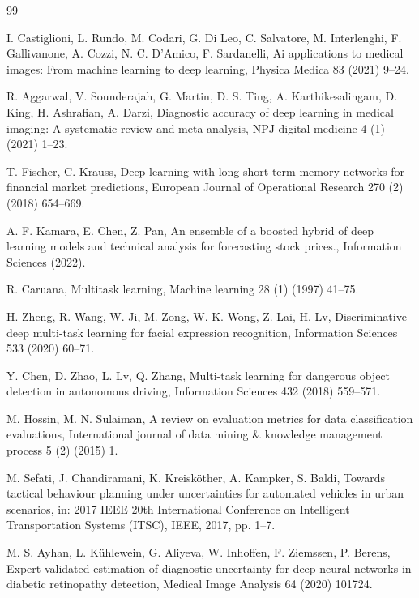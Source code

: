 \documentclass[12pt,a4paper]{article}
\begin{document}
	
	\begin{thebibliography}{99}
		
		I. Castiglioni, L. Rundo, M. Codari, G. Di Leo, C. Salvatore, M. Interlenghi, F. Gallivanone, A. Cozzi, N. C. D'Amico, F. Sardanelli, Ai applications to medical images: From machine learning to deep learning, Physica Medica 83 (2021) 9--24.
		
		R. Aggarwal, V. Sounderajah, G. Martin, D. S. Ting, A. Karthikesalingam, D. King, H. Ashrafian, A. Darzi, Diagnostic accuracy of deep learning in medical imaging: A systematic review and meta-analysis, NPJ digital medicine 4 (1) (2021) 1--23.
		
		T. Fischer, C. Krauss, Deep learning with long short-term memory networks for financial market predictions, European Journal of Operational Research 270 (2) (2018) 654--669.
		
		A. F. Kamara, E. Chen, Z. Pan, An ensemble of a boosted hybrid of deep learning models and technical analysis for forecasting stock prices., Information Sciences (2022).
		
		R. Caruana, Multitask learning, Machine learning 28 (1) (1997) 41--75.
		
		H. Zheng, R. Wang, W. Ji, M. Zong, W. K. Wong, Z. Lai, H. Lv, Discriminative deep multi-task learning for facial expression recognition, Information Sciences 533 (2020) 60--71.
		
		Y. Chen, D. Zhao, L. Lv, Q. Zhang, Multi-task learning for dangerous object detection in autonomous driving, Information Sciences 432 (2018) 559--571.
		
		M. Hossin, M. N. Sulaiman, A review on evaluation metrics for data classification evaluations, International journal of data mining \& knowledge management process 5 (2) (2015) 1.
		
		M. Sefati, J. Chandiramani, K. Kreisköther, A. Kampker, S. Baldi, Towards tactical behaviour planning under uncertainties for automated vehicles in urban scenarios, in: 2017 IEEE 20th International Conference on Intelligent Transportation Systems (ITSC), IEEE, 2017, pp. 1--7.
		
		M. S. Ayhan, L. Kühlewein, G. Aliyeva, W. Inhoffen, F. Ziemssen, P. Berens, Expert-validated estimation of diagnostic uncertainty for deep neural networks in diabetic retinopathy detection, Medical Image Analysis 64 (2020) 101724.
		

\end{thebibliography}
\end{document}
